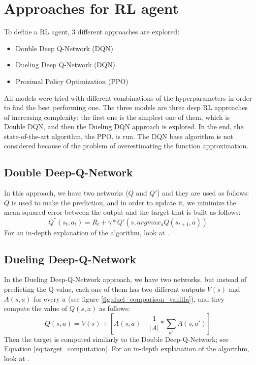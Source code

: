 \documentclass{article}
\begin{document}
\section{Approaches for RL agent} \label{section:Approaches}
To define a RL agent, 3 different approaches are explored:
\begin{itemize}
    \item Double Deep Q-Network (DQN) \cite{DoubleDeepQNetwork}
    \item Dueling Deep Q-Network (DQN) \cite{DuelDeepQNetwork}
    \item Proximal Policy Optimization (PPO) \cite{PPO}
\end{itemize}
All models were tried with different combinations of the hyperparameters in order to find the best performing one.
The three models are three deep RL approaches of increasing complexity; the first one is the simplest one of them, which is Double DQN, and then the Dueling DQN approach is explored. In the end, the state-of-the-art algorithm, the PPO, is run. The DQN base algorithm is not considered because of the problem of overestimating the function approximation.

\subsection{Double Deep-Q-Network} \label{subsection:Double}
In this approach, we have two networks ($Q$ and $Q'$) and they are used as follows: $Q$ is used to make the prediction, and in order to update it, we minimize the mean squared error between the output and the target that is built as follows:
\begin{equation}\label{eq:target_computation}
    Q^*(s_t,a_t) = R_t + \gamma * Q'(s, argmax_a Q(s_{t+1},a))
\end{equation}
For an in-depth explanation of the algorithm, look at \cite{DoubleDeepQNetwork}.

\subsection{Dueling Deep-Q-Network} \label{subsection:Duel}
In the Dueling Deep-Q-Network approach, we have two networks, but instead of predicting the Q value, each one of them has two different outputs $V(s)$ and $A(s,a)$ for every $a$ (see figure \ref{fig:duel_comparison_vanilla}), and they compute the value of $Q(s,a)$ as follows:
\begin{equation} \label{eq:q_v_a}
    Q(s,a) = V(s) + [A(s,a) + \frac{1}{|A|} *  \sum_{a'} A(s, a')]
\end{equation}
Then the target is computed similarly to the Double Deep-Q-Network; see Equation \ref{eq:target_computation}. For an in-depth explanation of the algorithm, look at \cite{DuelDeepQNetwork}.
\end{document}
